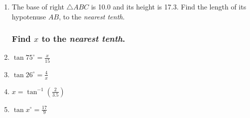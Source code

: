 \documentclass[12pt, twoside]{article}
\begin{document}
\begin{enumerate}
\item The base of right $\triangle ABC$ is 10.0 and its height is 17.3. Find the length of its hypotenuse $AB$, to the \emph{nearest tenth}.
  \begin{flushright}
  \end{flushright}

\subsubsection*{Find $x$ to the \emph{nearest tenth}.}

\item $\displaystyle \tan 75^\circ = \frac{x}{15}$ \vspace{3cm}
\item $\displaystyle \tan 26^\circ = \frac{4}{x}$ \vspace{4cm}
\item $\displaystyle x = \tan^{-1} (\frac{2}{3.5})$ \vspace{3cm}
\item $\displaystyle \tan x^\circ = \frac{17}{9}$ \vspace{3cm}


\end{enumerate}
\end{document}
